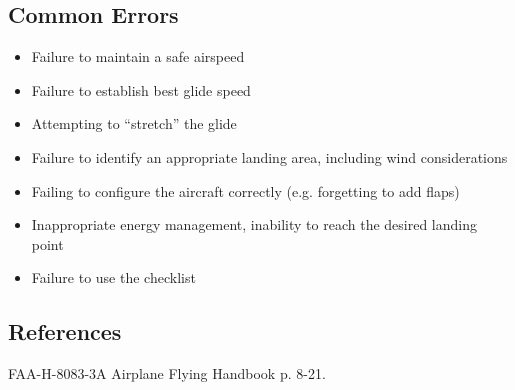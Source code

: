 \subsection{Common Errors}

\begin{itemize}
  \item Failure to maintain a safe airspeed
  \item Failure to establish best glide speed
  \item Attempting to ``stretch'' the glide
  \item Failure to identify an appropriate landing area, including wind
    considerations
  \item Failing to configure the aircraft correctly (e.g. forgetting to add
    flaps)
  \item Inappropriate energy management, inability to reach the desired landing
    point
  \item Failure to use the checklist
\end{itemize}

\subsection{References}

FAA-H-8083-3A Airplane Flying Handbook p. 8-21.

